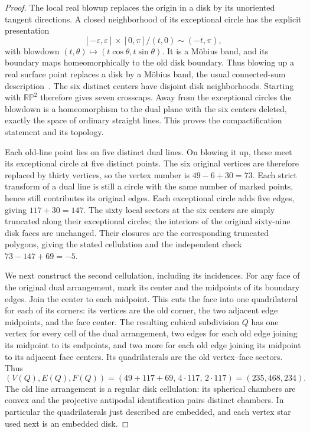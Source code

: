 \begin{proof}
The local real blowup replaces the origin in a disk by its unoriented
tangent directions. A closed neighborhood of its exceptional circle
has the explicit presentation
\[
 [-\varepsilon,\varepsilon]\times[0,\pi]\big/
       (t,0)\sim(-t,\pi),
\]
with blowdown $(t,\theta)\mapsto
(t\cos\theta,t\sin\theta)$. It is a M\"obius band, and its boundary
maps homeomorphically to the old disk boundary. Thus blowing up a
real surface point replaces a disk by a M\"obius band, the usual
connected-sum description~\cite[Corollary~F.3.2, p.~465]{Mangolte}.
The six distinct centers have disjoint disk neighborhoods. Starting
with $\mathbb {RP}^2$ therefore gives seven crosscaps. Away from the
exceptional circles the blowdown is a homeomorphism to the dual plane
with the six centers deleted, exactly the space of ordinary straight
lines. This proves the compactification statement and its topology.

Each old-line point lies on five distinct dual lines. On blowing it
up, these meet its exceptional circle at five distinct points. The
six original vertices are therefore replaced by thirty vertices,
so the vertex number is $49-6+30=73$. Each strict transform of a dual
line is still a circle with the same number of marked points, hence
still contributes its original edges. Each exceptional circle adds
five edges, giving $117+30=147$. The sixty local sectors at the six
centers are simply truncated along their exceptional circles;
the interiors of the original sixty-nine disk faces are unchanged.
Their closures are the corresponding truncated polygons, giving
the stated cellulation and the independent check
$73-147+69=-5$.

We next construct the second cellulation, including its incidences.
For any face of the original dual arrangement, mark its center and
the midpoints of its boundary edges. Join the center to each midpoint.
This cuts the face into one quadrilateral for each of its corners:
its vertices are the old corner, the two adjacent edge midpoints,
and the face center. The resulting cubical subdivision $Q$ has one
vertex for every cell of the dual arrangement, two edges for each
old edge joining its midpoint to its endpoints, and two more for
each old edge joining its midpoint to its adjacent face centers.
Its quadrilaterals are the old vertex--face sectors. Thus
\[
 (V(Q),E(Q),F(Q))=(49+117+69,\,4\cdot117,\,2\cdot117)
                   =(235,468,234).
\]
The old line arrangement is a regular disk cellulation: its spherical
chambers are convex and the projective antipodal identification pairs
distinct chambers. In particular the quadrilaterals just described
are embedded, and each vertex star used next is an embedded disk.


\end{proof}
